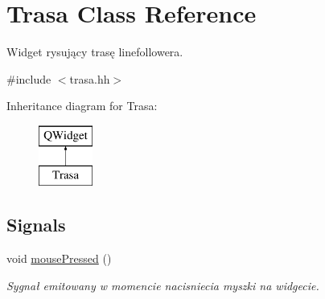 \hypertarget{class_trasa}{}\section{Trasa Class Reference}
\label{class_trasa}


Widget rysujący trasę linefollowera.  




{\ttfamily \#include $<$trasa.\+hh$>$}

Inheritance diagram for Trasa\+:\begin{figure}[H]
\begin{center}
\leavevmode
\includegraphics[height=2.000000cm]{class_trasa}
\end{center}
\end{figure}
\subsection*{Signals}
\begin{DoxyCompactItemize}
\item 
void \hyperlink{class_trasa_afe90b2b84a730591d1352ccc8e799627}{mouse\+Pressed} ()
\begin{DoxyCompactList}\small\item\em Sygnał emitowany w momencie nacisniecia myszki na widgecie. \end{DoxyCompactList}\end{DoxyCompactItemize}
